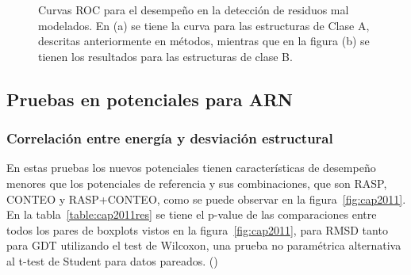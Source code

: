 \begin{figure}
\caption[Curvas ROC para la detección de resíduos mal modelados en proteínas]{Curvas ROC para el desempeño en la detección de residuos mal modelados. En (a) se tiene la curva para las estructuras de Clase A, descritas anteriormente en métodos, mientras que en la figura (b) se tienen los resultados para las estructuras de clase B.}
\label{fig:ferrada2007}
\end{figure}

\cleardoublepage
\subsection{Pruebas en potenciales para ARN}
\subsubsection{Correlación entre energía y desviación estructural}
\par
En estas pruebas los nuevos potenciales tienen características de desempeño menores que los potenciales de referencia y sus combinaciones, que son RASP, CONTEO y RASP+CONTEO, como se puede observar en la figura~\ref{fig:cap2011}.
En la tabla~\ref{table:cap2011res} se tiene el p-value de las comparaciones entre todos los pares de boxplots vistos en la figura~\ref{fig:cap2011}, para RMSD tanto para GDT utilizando el test de Wilcoxon, una prueba no paramétrica alternativa al t-test de Student para datos pareados. (\cite{Wilcoxon1945})

